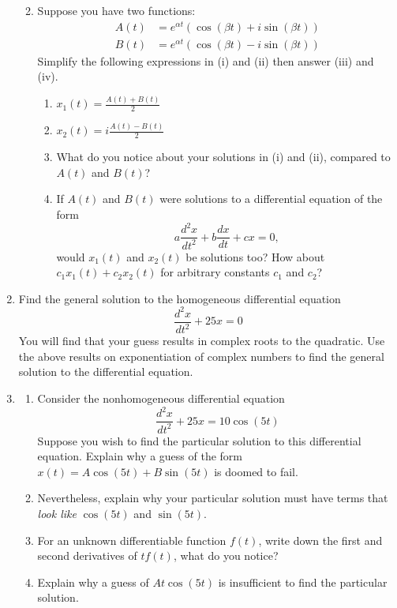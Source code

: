\begin{enumerate}[resume]
\begin{enumerate}
\clearpage

\item Suppose you have two functions: \label{07problem07partc}
\begin{align*}
A(t) &= e^{\alpha t} (\cos(\beta t) + i\sin(\beta t)) \\
B(t) &= e^{\alpha t} (\cos(\beta t) - i\sin(\beta t))
\end{align*}
Simplify the following expressions in (i) and (ii) then answer (iii) and (iv).
\begin{enumerate}
\item $x_1(t) = \displaystyle\frac{A(t) + B(t)}{2}$ \label{07problem07partci} \vfill
\item $x_2(t) = i\displaystyle\frac{A(t) - B(t)}{2}$ \label{07problem07partcii} \vfill
\item What do you notice about your solutions in (i) and (ii), compared to $A(t)$ and $B(t)$? \label{07problem07partciii} \vfill
\item If $A(t)$ and $B(t)$ were solutions to a differential equation of the form
\[
a\frac{d^2x}{dt^2} + b\frac{dx}{dt} + cx = 0,
\]
would $x_1(t)$ and $x_2(t)$ be solutions too? How about $c_1x_1(t) + c_2x_2(t)$ for arbitrary constants $c_1$ and $c_2$? \label{07problem07partciv} \vfill
\end{enumerate}
 
\end{enumerate}

\clearpage

\item Find the general solution to the homogeneous differential equation \label{07problem14} 
\[
\frac{d^2x}{dt^2}+25x=0
\]
You will find that your guess results in complex roots to the quadratic.  Use the above results on exponentiation of complex numbers to find the general solution to the differential equation. \vspace{1.75in}

\item \label{07problem15}
\begin{enumerate}
\item Consider the nonhomogeneous differential equation \label{07problem15parta}
\[
\frac{d^2x}{dt^2}+25x=10\cos(5t)
\]
Suppose you wish to find the particular solution to this differential equation. Explain why a guess of the form $x(t) = A\cos(5t) + B\sin(5t)$ is doomed to fail. \vfill
\item Nevertheless, explain why your particular solution must have terms that \textit{look like} $\cos(5t)$ and $\sin(5t)$. \label{07problem15partb} \vfill
\item For an unknown differentiable function $f(t)$, write down the first and second derivatives of $tf(t)$, what do you notice? \label{07problem15partc} \vfill
\item Explain why a guess of $At\cos(5t)$ is insufficient to find the particular solution. \label{07problem15partd} \vfill


\end{enumerate}
\end{enumerate}
